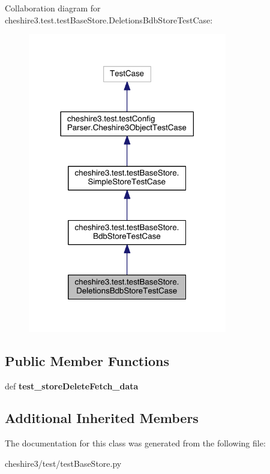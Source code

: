 Collaboration diagram for cheshire3.\-test.\-test\-Base\-Store.\-Deletions\-Bdb\-Store\-Test\-Case\-:
\nopagebreak
\begin{figure}[H]
\begin{center}
\leavevmode
\includegraphics[width=246pt]{classcheshire3_1_1test_1_1test_base_store_1_1_deletions_bdb_store_test_case__coll__graph}
\end{center}
\end{figure}
\subsection*{Public Member Functions}
\begin{DoxyCompactItemize}
\item 
\hypertarget{classcheshire3_1_1test_1_1test_base_store_1_1_deletions_bdb_store_test_case_afff8471c5f0e4d497c2bbda095e5aeab}{def {\bfseries test\-\_\-store\-Delete\-Fetch\-\_\-data}}\label{classcheshire3_1_1test_1_1test_base_store_1_1_deletions_bdb_store_test_case_afff8471c5f0e4d497c2bbda095e5aeab}

\end{DoxyCompactItemize}
\subsection*{Additional Inherited Members}


The documentation for this class was generated from the following file\-:\begin{DoxyCompactItemize}
\item 
cheshire3/test/test\-Base\-Store.\-py\end{DoxyCompactItemize}
